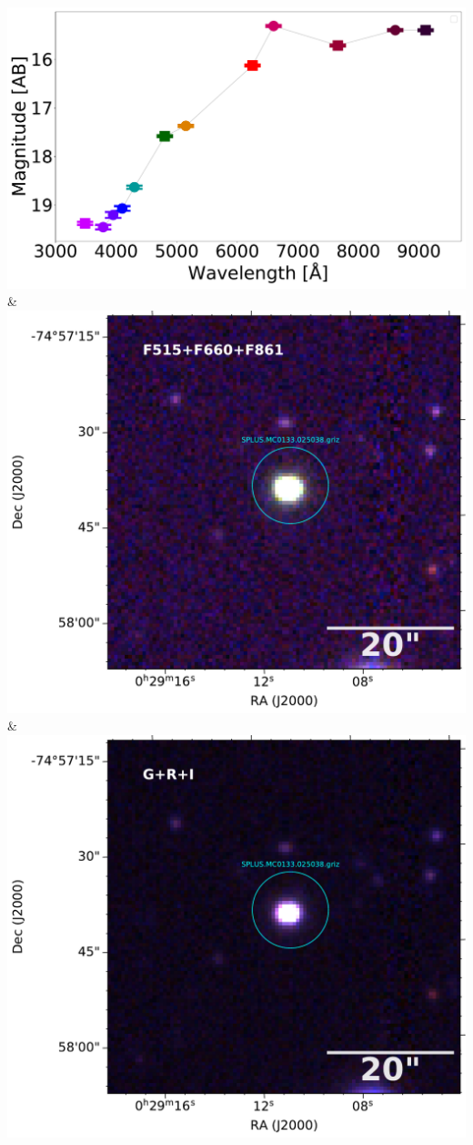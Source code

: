 \includegraphics[width=0.3\linewidth, clip]{photopectrum_splus_MC0133-025038_aper.pdf} & \includegraphics[width=0.3\linewidth, clip]{MC0133/MC0133_F861_025038-RGB.pdf} & \includegraphics[width=0.3\linewidth, clip]{MC0133/MC0133_I_025038-RGB.pdf} \\
